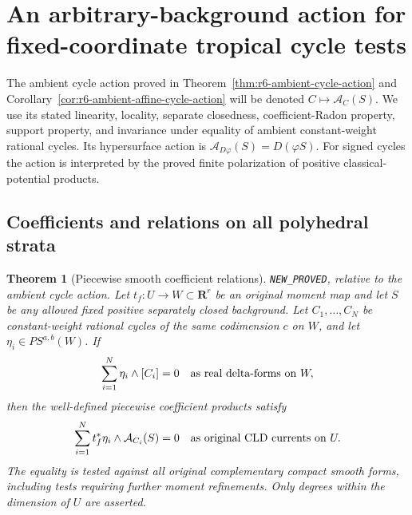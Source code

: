 \documentclass[11pt,a4paper]{article}
\numberwithin{equation}{section}
\newtheorem{theorem}{Theorem}[section]
\theoremstyle{definition}
\theoremstyle{remark}
\begin{document}


\section{An arbitrary-background action for fixed-coordinate tropical cycle tests}
\label{sec:r6-delta-torus-action}

The ambient cycle action proved in
Theorem~\ref{thm:r6-ambient-cycle-action} and
Corollary~\ref{cor:r6-ambient-affine-cycle-action} will be denoted
$C\mapsto\mathcal A_C(S)$.  We use its stated linearity, locality,
separate closedness, coefficient-Radon property, support property,
and invariance under equality of ambient constant-weight rational
cycles.  Its hypersurface action is $\mathcal A_{D\varphi}(S)=D(\varphi S)$.
For signed cycles the action is interpreted by the proved finite
polarization of positive classical-potential products.

\subsection{Coefficients and relations on all polyhedral strata}

\begin{theorem}[Piecewise smooth coefficient relations]
\label{thm:r6-cycle-coefficient-relations}
\textnormal{\texttt{NEW\_PROVED}, relative to the ambient cycle action.}
Let $t_f:U\to W\subset\mathbf R^r$ be an original moment map and
let $S$ be any allowed fixed positive separately closed background.
Let $C_1,\ldots,C_N$ be constant-weight rational cycles of the same
codimension $c$ on $W$, and let $\eta_i\in PS^{a,b}(W)$.
If
\begin{equation}
                      \sum_{i=1}^N\eta_i\wedge[C_i]=0
                         \quad\hbox{as real delta-forms on }W,
 \label{eq:r6-ambient-coefficient-zero}
\end{equation}
then the well-defined piecewise coefficient products satisfy
\begin{equation}
             \sum_{i=1}^N t_f^*\eta_i\wedge\mathcal A_{C_i}(S)=0
                        \quad\hbox{as original CLD currents on }U.
 \label{eq:r6-coefficient-action-zero}
\end{equation}
The equality is tested against all original complementary compact
smooth forms, including tests requiring further moment refinements.
Only degrees within the dimension of $U$ are asserted.
\end{theorem}
\end{document}
